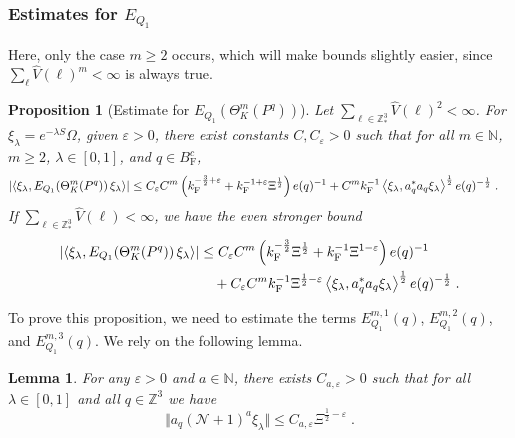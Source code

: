 \documentclass[12pt,a4paper]{article}
\numberwithin{equation}{section}
\newcommand{\cN}{\mathcal{N}}
\newcommand{\NNN}{\mathbb{N}}
\newcommand{\1}{\mathbb{I}}
\newcommand{\F}{\mathrm{F}}
\newcommand{\N}{\mathbb{N}}
\newcommand{\Z}{\mathbb{Z}}
\newcommand{\half}{\frac{1}{2}}
\newcommand{\eva}[1]{\left\langle #1 \right\rangle}
\theoremstyle{plain}
\newtheorem{lemma}[theorem]{Lemma}
\newtheorem{proposition}[theorem]{Proposition}
\theoremstyle{definition}
\theoremstyle{remark}
\theoremstyle{plain}
\theoremstyle{definition}
\theoremstyle{remark}
\begin{document}
\subsubsection{Estimates for $E_{Q_1}$}

Here, only the case $ m \ge 2 $ occurs, which will make bounds slightly easier, since $ \sum_\ell \hat{V}(\ell)^m < \infty $ is always true.

\begin{proposition}[Estimate for $E_{Q_1}(\Theta^m_{K}(P^q))$]\label{prop:finEQ1est}
Let $ \sum_{\ell \in \Z^3_*} \hat{V}(\ell)^2 < \infty $. For $\xi_\lambda = e^{-\lambda S} \Omega$, given $ \varepsilon > 0 $, there exist constants $ C, C_\varepsilon > 0 $ such that for all $ m \in \NNN $, $ m \ge 2 $, $ \lambda \in [0,1] $, and $ q \in B_{\F}^c $,
\begin{align} \label{eq:finalEQ1est_Coulomb}
	\abs{\eva{\xi_\lambda, E_{Q_1}\!\left(\Theta^m_K(P^q)\right) \xi_\lambda}}
	&\leq C_\varepsilon C^m \left( k_{\F}^{-\frac 32 + \varepsilon}
		+ k_{\F}^{-1 + \varepsilon} \Xi^\half \right)
		e(q)^{-1}
		+ C^m k_{\F}^{-1} \eva{\xi_\lambda, a_q^* a_q \xi_\lambda}^{\half} e(q)^{-\half} \;.
\end{align}
If $ \sum_{\ell \in \Z^3_*} \hat{V}(\ell) < \infty $, we have the even stronger bound
\begin{align} \label{eq:finalEQ1est}
	\abs{\eva{\xi_\lambda, E_{Q_1}\!\left(\Theta^m_K(P^q)\right) \xi_\lambda}}
	&\leq C_\varepsilon C^m \left(
		k_{\F}^{-\frac{3}{2}} \Xi^\half
		+ k_{\F}^{-1}\Xi^{1-\varepsilon} \right) e(q)^{-1} \nonumber\\
	&\quad + C_\varepsilon C^m k_{\F}^{-1} \Xi^{\half - \varepsilon} \eva{\xi_\lambda, a_q^* a_q \xi_\lambda}^{\half} e(q)^{-\half} \;.
\end{align}
\end{proposition}

To prove this proposition, we need to estimate the terms $ E^{m,1}_{Q_1}(q) $, $ E^{m,2}_{Q_1}(q) $, and $ E^{m,3}_{Q_1}(q) $. We rely on the following lemma.

\begin{lemma} \label{lem:Xi_halfminusepsilon}
For any $ \varepsilon > 0 $ and $ a \in \N $, there exists $ C_{a,\varepsilon} > 0 $ such that for all $ \lambda \in [0,1] $ and all $ q \in \Z^3 $ we have
\begin{equation} \label{eq:Xi_halfminusepsilon}
	\Vert a_q (\cN + 1)^a \xi_\lambda \Vert
	\le C_{a,\varepsilon} \Xi^{\half-\varepsilon} \;.
\end{equation}
\end{lemma}
\end{document}
